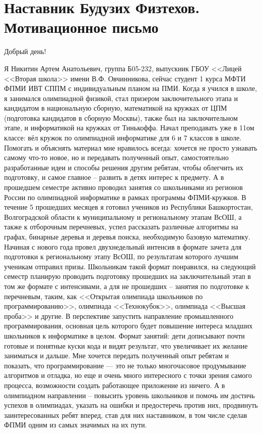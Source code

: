 \section{\textbf{Наставник Будузих Физтехов. Мотивационное письмо}}
\smallskip

\quad Добрый день!
\smallskip

\quad Я Никитин Артем Анатольевич, группа Б05-232, выпускник ГБОУ <<Лицей <<Вторая школа>> имени В.Ф. Овчинникова, сейчас студент 1 курса МФТИ
ФПМИ ИВТ СППМ с индивидуальным планом на ПМИ. Когда я учился в школе, я занимался олимпиадной физикой, стал призером заключительного этапа и
кандидатом в национальную сборную, математикой на кружках от ЦПМ (подготовка кандидатов в сборную Москвы), также был на заключительном этапе,
и информатикой на кружках от Тинькоффа. Начал преподавать уже в 11ом классе: вёл кружок по олимпиадной информатике для 6 и 7 классов в школе.
Помогать и объяснять материал мне нравилось всегда: хочется не просто узнавать самому что-то новое, но и передавать полученный опыт,
самостоятельно разработанные идеи и способы решения другим ребятам, чтобы облегчить их подготовку, и самое главное – развить в детях интерес к
предмету. А в прошедшем семестре активно проводил занятия со школьниками из регионов России по олимпиадной информатике в рамках программы
ФПМИ-кружков. В течение 5 прошедших месяцев я готовил учеников из Республики Башкортостан, Волгоградской области к муниципальному и
региональному этапам ВсОШ, а также к отборочным перечневых, успел рассказать различные алгоритмы на графах, бинарные деревья и деревья поиска,
необходимую базовую математику. Начиная с нового года провел двухнедельный интенсив в формате зачета для подготовки к региональному этапу ВсОШ,
по результатам которого лучшим ученикам отправил призы. Школьникам такой формат понравился, на следующий семестр планирую проводить подготовку
прошедших на заключительный этап в том же формате с интенсивами, а для не прошедших – занятия по подготовке к перечневым, таким, как <<Открытая
олимпиада школьников по программированию>>, олимпиада <<Технокубок>>, олимпиада <<Высшая проба>> и другие. В перспективе запустить направление
промышленного программирования, основная цель которого будет повышение интереса младших школьников к информатике в целом. Формат занятий: дети
дописывают почти готовые и понятные куски кода и видят результат, что увеличивает их желание заниматься и дальше. Мне хочется передать
полученный опыт ребятам и показать, что программирование --– это не только многочасовое продумывание алгоритмов и отладка, но еще и очень много
интересного с точки зрения самого процесса, возможности создать работающее приложение из ничего. А в олимпиадном направлении – повысить уровень
школьников и помочь им достичь успехов в олимпиадах, указать на ошибки и предостеречь против них, продвинуть заинтересованных ребят вперед,
став для них наставником, в том числе сделав ФПМИ одним из самых значимых на их пути.


